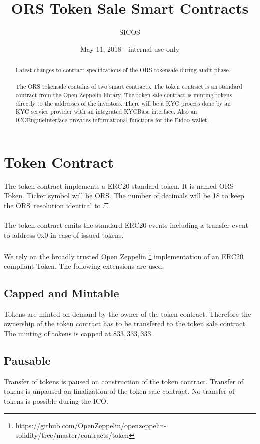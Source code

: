 \documentclass{article}
\title{ORS Token Sale Smart Contracts}
\author{SICOS}
\date{May 11, 2018 - internal use only}
\newcommand{\ether}{$\Xi$}
\newcommand{\ors}{{\sf ORS}}
\newcommand{\orsT}{{\sf ORS Token}}
\begin{document}
\maketitle


 \begin{abstract}
 Latest changes to contract specifications of the ORS tokensale during audit
 phase.\\\\
 The ORS tokensale contains of two smart contracts. The token contract is an standard contract from the Open
 Zeppelin library. The token sale contract is minting tokens directly to the
 addresses of the investors. There will be a KYC process done by an KYC service
 provider with an integrated KYCBase interface. Also an ICOEngineInterface
 provides informational functions for the Eidoo wallet.
 \end{abstract}

\section{Token Contract}
The token contract implements a ERC20 standard token. It is named \orsT.
Ticker symbol will be \ors. The number of decimals will be 18 to keep the
\ors \ resolution  identical to \ether. \\\\
The token contract emits the standard ERC20 events including a transfer event to
address 0x0 in case of issued tokens.\\\\
We rely on the broadly trusted Open
Zeppelin \footnote{https://github.com/OpenZeppelin/openzeppelin-solidity/tree/master/contracts/token}
implementation of an ERC20 compliant Token. The following extensions are used:

\subsection{Capped and Mintable}
Tokens are minted on demand by the owner of the token contract. Therefore the
ownership of the token contract has to be transfered to the token sale contract. The minting of tokens is capped at
$833,333,333$.

\subsection{Pausable}
Transfer of tokens is paused on construction of the token contract. Transfer of
tokens is unpaused on finalization of the token sale contract. No transfer of
tokens is possible during the ICO.
\end{document}

